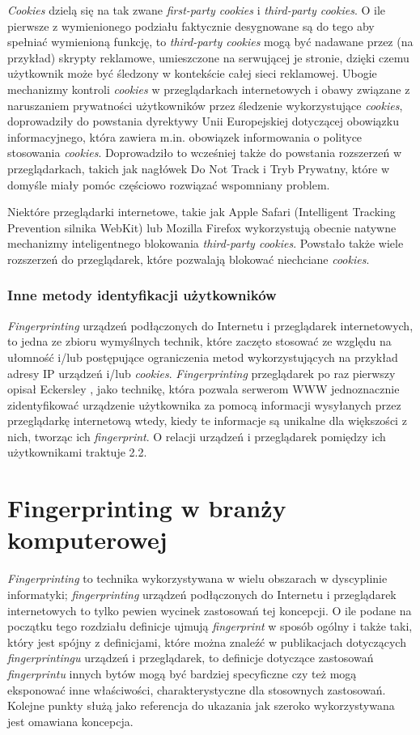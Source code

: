 \emph{Cookies} dzielą się na tak zwane \emph{first-party cookies} i
\emph{third-party cookies}. O ile pierwsze z wymienionego podziału faktycznie
desygnowane są do tego aby spełniać wymienioną funkcję, to \emph{third-party
cookies} mogą być nadawane przez (na przykład) skrypty reklamowe, umieszczone na
serwującej je stronie, dzięki czemu użytkownik może być śledzony w kontekście
całej sieci reklamowej. Ubogie mechanizmy kontroli \emph{cookies} w
przeglądarkach internetowych i obawy związane z naruszaniem prywatności
użytkowników przez śledzenie wykorzystujące \emph{cookies}, doprowadziły do
powstania dyrektywy Unii Europejskiej dotyczącej obowiązku informacyjnego, która
zawiera m.in. obowiązek informowania o polityce stosowania \emph{cookies}.
Doprowadziło to wcześniej także do powstania rozszerzeń w przeglądarkach, takich
jak nagłówek Do Not Track i Tryb Prywatny, które w domyśle miały pomóc częściowo
rozwiązać wspomniany problem.

Niektóre przeglądarki internetowe, takie jak Apple Safari (Intelligent Tracking
Prevention silnika WebKit) lub Mozilla Firefox wykorzystują obecnie natywne
mechanizmy inteligentnego blokowania \emph{third-party cookies}. Powstało także
wiele rozszerzeń do przeglądarek, które pozwalają blokować niechciane
\emph{cookies}.

\subsubsection{Inne metody identyfikacji użytkowników}
\emph{Fingerprinting} urządzeń podłączonych do Internetu i przeglądarek
internetowych, to jedna ze zbioru wymyślnych technik, które zaczęto stosować ze
względu na ułomność i/lub postępujące ograniczenia metod wykorzystujących na
przykład adresy IP urządzeń i/lub \emph{cookies}. \emph{Fingerprinting}
przeglądarek po raz pierwszy opisał Eckersley \cite{eckersley2010unique}, jako
technikę, która pozwala serwerom WWW jednoznacznie zidentyfikować urządzenie
użytkownika za pomocą informacji wysyłanych przez przeglądarkę internetową
wtedy, kiedy te informacje są unikalne dla większości z nich, tworząc ich
\emph{fingerprint}. O relacji urządzeń i przeglądarek pomiędzy ich użytkownikami
traktuje 2.2.

\section{Fingerprinting w branży komputerowej}
\emph{Fingerprinting} to technika wykorzystywana w wielu obszarach w dyscyplinie
informatyki; \emph{fingerprinting} urządzeń podłączonych do Internetu i
przeglądarek internetowych to tylko pewien wycinek zastosowań tej koncepcji. O
ile podane na początku tego rozdziału definicje ujmują \emph{fingerprint} w
sposób ogólny i także taki, który jest spójny z definicjami, które można znaleźć
w publikacjach dotyczących \emph{fingerprintingu} urządzeń i przeglądarek, to
definicje dotyczące zastosowań \emph{fingerprintu} innych bytów mogą być
bardziej specyficzne czy też mogą eksponować inne właściwości, charakterystyczne
dla stosownych zastosowań. Kolejne punkty służą jako referencja do ukazania jak
szeroko wykorzystywana jest omawiana koncepcja.

